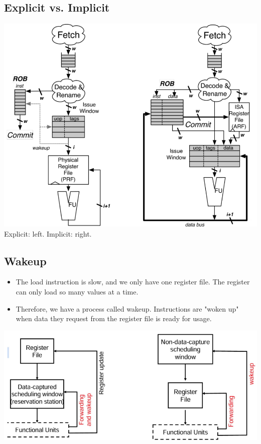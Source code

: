 \documentclass[10pt]{article}
\begin{document}
\subsection*{Explicit vs. Implicit}
\begin{center}
    \includegraphics*[scale=0.8]{W6_1.png}
    Explicit: left.  Implicit: right.
\end{center}
\subsection*{Wakeup}
\begin{itemize}
    \item The load instruction is slow, and we only have one register file.  The register can only load so many values at a time.
    \item Therefore, we have a process called wakeup. Instructions are "woken up" when data they request from the register file is ready for usage.
\end{itemize}
\begin{center}
    \includegraphics*[scale=0.8]{W6_2.png}
\end{center}
\end{document}
